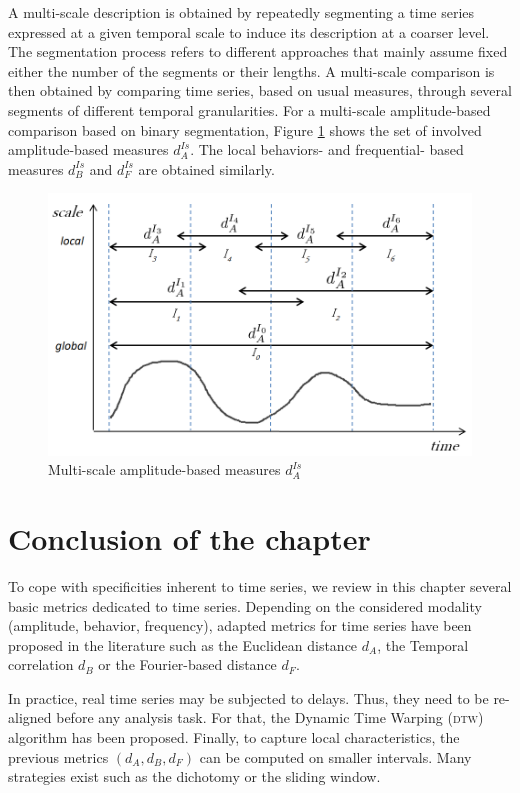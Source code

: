 A multi-scale description is obtained by repeatedly segmenting a time series expressed at a given temporal scale to induce its description at a coarser level. The segmentation process refers to different approaches that mainly assume fixed either the number of the segments or their lengths. A multi-scale
comparison is then obtained by comparing time series, based on usual measures, through several segments of different temporal granularities. For a multi-scale amplitude-based comparison based on binary segmentation, Figure \ref{fig:Intervalles} shows the set of involved amplitude-based measures $d^{Is}_A$. The local behaviors- and frequential- based measures $d^{Is}_B$ and $d^{Is}_F$ are obtained similarly.

\begin{figure}[h!]
\centering
\includegraphics[width=0.7\linewidth]{images/Intervalles}
\caption{Multi-scale amplitude-based measures $d^{Is}_A$}
\label{fig:Intervalles}
\end{figure}



\newpage
\section{Conclusion of the chapter}
To cope with specificities inherent to time series, we review in this chapter several basic metrics dedicated to time series. Depending on the considered modality (amplitude, behavior, frequency), adapted metrics for time series have been proposed in the literature such as the Euclidean distance $d_A$, the Temporal correlation $d_B$ or the Fourier-based distance $d_F$.

In practice, real time series may be subjected to delays. Thus, they need to be re-aligned before any analysis task. For that, the Dynamic Time Warping (\textsc{dtw}) algorithm has been proposed. Finally, to capture local characteristics, the previous metrics $(d_A, d_B, d_F)$ can be computed on smaller intervals. Many strategies exist such as the dichotomy or the sliding window.

